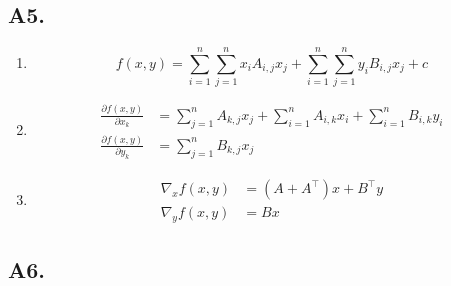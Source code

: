 \documentclass[fleqn]{article}
\begin{document}

\subsection*{A5.}

\begin{enumerate}[label=(\alph*)]

\item
\[
f(x, y) = \sum_{i=1}^{n}\sum_{j=1}^{n} x_i A_{i,j} x_j + \sum_{i=1}^{n}\sum_{j=1}^{n} y_i B_{i,j} x_j + c
\]

\item
\begin{align*}
\frac{\partial f(x, y)}{\partial x_k} &= \sum_{j=1}^{n} A_{k,j} x_j + \sum_{i=1}^{n} A_{i,k} x_i + \sum_{i=1}^{n} B_{i,k} y_i \\
\frac{\partial f(x, y)}{\partial y_k} &= \sum_{j=1}^{n} B_{k,j} x_j
\end{align*}

\item
\begin{align*}
\nabla_x f(x, y) &= (A + A^\top)x + B^\top y \\
\nabla_y f(x, y) &= Bx
\end{align*}

\end{enumerate}


\subsection*{A6.}
\end{document}
